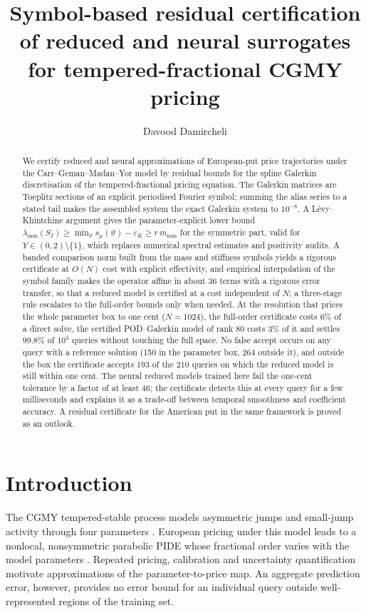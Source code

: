 \documentclass[11pt]{amsart}
\title[Symbol-based residual certification for CGMY pricing]
      {Symbol-based residual certification of reduced and neural surrogates\\ for tempered-fractional CGMY pricing}
\author{Davood Damircheli}
\date{}
\theoremstyle{remark}
\begin{document}
\begin{abstract}
We certify reduced and neural approximations of European-put price trajectories under the
Carr--Geman--Madan--Yor model by residual bounds for the spline Galerkin discretisation of the
tempered-fractional pricing equation.  The Galerkin matrices are Toeplitz sections of an explicit
periodised Fourier symbol; summing the alias series to a stated tail makes the assembled system
the exact Galerkin system to $10^{-8}$.  A L\'evy--Khintchine argument gives the parameter-explicit
lower bound $\lambda_{\min}(S_I)\ge\min_\vartheta s_\mu(\vartheta)-\varepsilon_K\ge r\,m_{\min}$ for
the symmetric part, valid for $Y\in(0,2)\setminus\{1\}$, which replaces numerical spectral estimates
and positivity audits.  A banded comparison norm built from the mass and stiffness symbols yields a
rigorous certificate at $O(N)$ cost with explicit effectivity, and empirical interpolation of the
symbol family makes the operator affine in about 36 terms with a rigorous error transfer, so that a
reduced model is certified at a cost independent of $N$; a three-stage rule escalates to the
full-order bounds only when needed.  At the resolution that prices the whole parameter box to one
cent ($N=1024$), the full-order certificate costs $6\%$ of a direct solve, the certified
POD--Galerkin model of rank $80$ costs $3\%$ of it and settles $99.8\%$ of $10^4$ queries without
touching the full space.  No false accept occurs on any query with a reference solution (150 in
the parameter box, 264 outside it), and outside the box the certificate accepts 193 of the 210
queries on which the reduced model is still within one cent.  The neural
reduced models trained here fail the one-cent tolerance by a factor of at least $46$; the certificate
detects this at every query for a few milliseconds and explains it as a trade-off between
temporal smoothness and coefficient accuracy.  A residual certificate for the American put
in the same framework is proved as an outlook.
\end{abstract}
\maketitle

\section{Introduction}
\label{sec:introduction}
The CGMY tempered-stable process models asymmetric jumps and small-jump
activity through four parameters \cite{CarrGemanMadanYor2002}. European
pricing under this model leads to a nonlocal, nonsymmetric parabolic PIDE
whose fractional order varies with the model parameters
\cite{CarteadelCastilloNegrete2007}. Repeated pricing, calibration and
uncertainty quantification motivate approximations of the parameter-to-price
map. An aggregate prediction error, however, provides no error bound for an
individual query outside well-represented regions of the training set.
\end{document}
